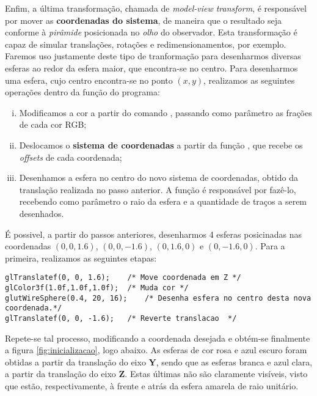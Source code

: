 \documentclass[12pt, a4paper]{article}
\begin{document}
\vspace{12pt}

Enfim, a última transformação, chamada de \textit{model-view transform}, é
responsável por mover as \textbf{coordenadas do sistema}, de maneira que o
resultado seja conforme à \textit{pirâmide} posicionada no \textit{olho} do
observador. Esta transformação é capaz de simular translações, rotações e
redimensionamentos, por exemplo. Faremos uso justamente deste tipo de
tranformação para desenharmos diversas esferas ao redor da esfera maior, que
encontra-se no centro. Para desenharmos uma esfera, cujo centro encontra-se no
ponto \((x,y)\), realizamos as seguintes operações dentro da função
 do programa:

\begin{enumerate} [i.]
  \item Modificamos a cor a partir do comando , passando como
  parâmetro as frações de cada cor RGB;
  \item Deslocamos o \textbf{sistema de coordenadas} a partir da função
  , que recebe os \textit{offsets} de cada coordenada;
  \item Desenhamos a esfera no centro do novo sistema de coordenadas, obtido da
  translação realizada no passo anterior. A função  é
  responsável por fazê-lo, recebendo como parâmetro o raio da esfera e a
  quantidade de traços a serem desenhados.
\end{enumerate}

É possivel, a partir do passos anteriores, desenharmos 4 esferas posicinadas nas
coordenadas \((0, 0, 1.6)\), \((0, 0, -1.6)\), \((0, 1.6, 0)\) e \((0, -1.6,
0)\). Para a primeira, realizamos as seguintes etapas:

\begin{lstlisting}[keywordstyle=\ttfamily, style=nonumbers]
glTranslatef(0, 0, 1.6);	/* Move coordenada em Z */
glColor3f(1.0f,1.0f,1.0f);	/* Muda cor */
glutWireSphere(0.4, 20, 16);    /* Desenha esfera no centro desta nova coordenada.*/ 
glTranslatef(0, 0, -1.6);	/* Reverte translacao  */
\end{lstlisting}

Repete-se tal processo, modificando a coordenada desejada e obtém-se finalmente
a figura \ref{fig:inicializacao}, logo abaixo. As esferas de cor rosa e azul
escuro foram obtidas a partir da translação do eixo \textbf{Y}, sendo que as
esferas branca e azul clara, a partir da translação do eixo \textbf{Z}. Estas
últimas não são claramente visíveis, visto que estão, respectivamente, à frente
e atrás da esfera amarela de raio unitário.
\end{document}
